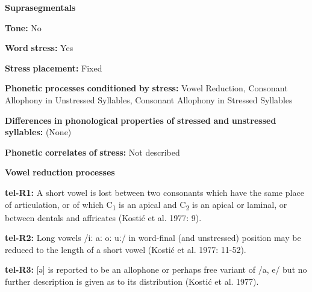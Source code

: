 \begin{styleBody}
\textbf{Suprasegmentals}
\end{styleBody}

\begin{styleBody}
\textbf{Tone:} No
\end{styleBody}

\begin{styleBody}
\textbf{Word} \textbf{stress:} Yes
\end{styleBody}

\begin{styleBody}
\textbf{Stress} \textbf{placement:} Fixed
\end{styleBody}

\begin{styleBody}
\textbf{Phonetic} \textbf{processes} \textbf{conditioned} \textbf{by} \textbf{stress:} Vowel Reduction, Consonant Allophony in Unstressed Syllables, Consonant Allophony in Stressed Syllables
\end{styleBody}

\begin{styleBody}
\textbf{Differences} \textbf{in} \textbf{phonological} \textbf{properties} \textbf{of} \textbf{stressed} \textbf{and} \textbf{unstressed} \textbf{syllables:} (None)
\end{styleBody}

\begin{styleBody}
\textbf{Phonetic} \textbf{correlates} \textbf{of} \textbf{stress:} Not described
\end{styleBody}

\begin{styleBody}
\textbf{Vowel} \textbf{reduction} \textbf{processes}
\end{styleBody}

\begin{styleBody}
\textbf{tel-R1:} A short vowel is lost between two consonants which have the same place of articulation, or of which C\textsubscript{1} is an apical and C\textsubscript{2} is an apical or laminal, or between dentals and affricates (Kostić et al. 1977: 9).
\end{styleBody}

\begin{styleBody}
\textbf{tel-R2:} Long vowels /iː aː oː uː/ in word-final (and unstressed) position may be reduced to the length of a short vowel (Kostić et al. 1977: 11-52).
\end{styleBody}

\begin{styleBody}
\textbf{tel-R3:} [ə] is reported to be an allophone or perhaps free variant of /a, e/ but no further description is given as to its distribution (Kostić et al. 1977).
\end{styleBody}


